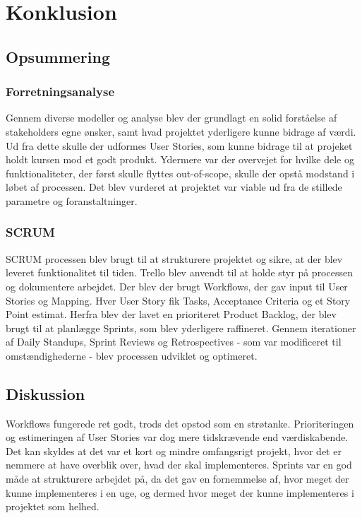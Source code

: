 \chapter{Konklusion}
\label{chapter:conclusion}

\section{Opsummering}
\label{sec:conclusion_summary}

\subsection{Forretningsanalyse}
Gennem diverse modeller og analyse blev der grundlagt en solid forståelse af stakeholders egne ønsker, samt hvad projektet yderligere kunne bidrage af værdi. 
Ud fra dette skulle der udformes User Stories, som kunne bidrage til at projeket holdt kursen mod et godt produkt. 
Ydermere var der overvejet for hvilke dele og funktionaliteter, der først skulle flyttes out-of-scope, skulle der opstå modstand i løbet af processen.
Det blev vurderet at projektet var viable ud fra de stillede parametre og foranstaltninger. 

\subsection{SCRUM}
SCRUM processen blev brugt til at strukturere projektet og sikre, at der blev leveret funktionalitet til tiden.
Trello blev anvendt til at holde styr på processen og dokumentere arbejdet.
Der blev der brugt Workflows, der gav input til User Stories og Mapping. Hver User Story fik Tasks, Acceptance Criteria og et Story Point estimat.
Herfra blev der lavet en prioriteret Product Backlog, der blev brugt til at planlægge Sprints, som blev yderligere raffineret.
Gennem iterationer af Daily Standups, Sprint Reviews og Retrospectives - som var modificeret til omstændighederne - blev processen udviklet og optimeret.



\section{Diskussion}
\label{sec:conclusion_discussion}
Workflows fungerede ret godt, trods det opstod som en strøtanke. Prioriteringen og estimeringen af User Stories var dog mere tidskrævende end værdiskabende. 
Det kan skyldes at det var et kort og mindre omfangsrigt projekt, hvor det er nemmere at have overblik over, hvad der skal implementeres.
Sprints var en god måde at strukturere arbejdet på, da det gav en fornemmelse af, hvor meget der kunne implementeres i en uge, og dermed hvor meget der kunne implementeres i projektet som helhed.

